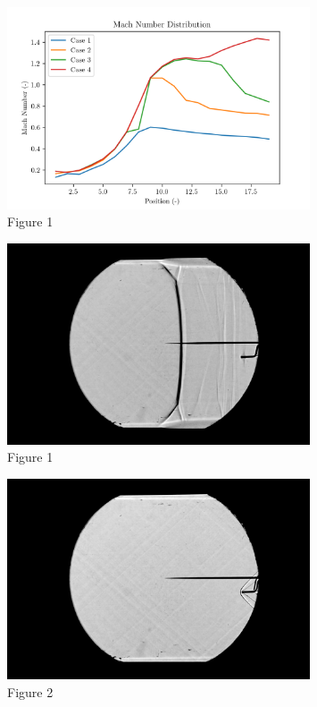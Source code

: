 \documentclass[8pt]{article}
\begin{document}
\begin{figure}[H]
    \centering
    \includegraphics[width=0.8\textwidth]{mach_number_distribution_corrected.png}
    \caption{Figure 1}
    \label{fig:figure5}
\end{figure}

\begin{figure}[H]
    \centering
    \includegraphics[width=0.8\textwidth]{starting_shock.jpg}
    \caption{Figure 1}
    \label{fig:figure6}
\end{figure}

\begin{figure}[H]
    \centering
    \includegraphics[width=0.8\textwidth]{working_state.jpg}
    \caption{Figure 2}
    \label{fig:figure7}
\end{figure}
\end{document}
